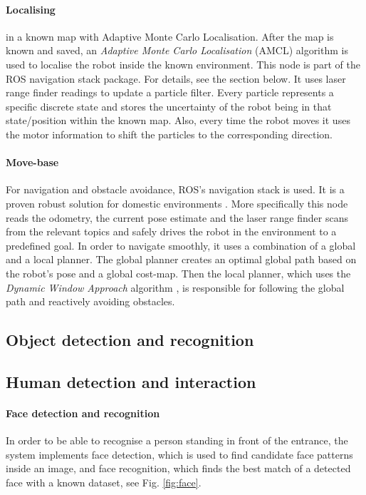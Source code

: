 \paragraph{Localising} in a known map with Adaptive Monte Carlo Localisation.
After the map is known and saved, an \textit{Adaptive Monte Carlo Localisation} (AMCL)\cite{amcl} algorithm is used to localise the robot inside the known environment. This node is part of the ROS \textsf{navigation stack} package. For details, see the section below. It uses laser range finder readings to update a particle filter. Every particle represents a specific discrete state and stores the uncertainty of the robot being in that state/position within the known map. Also, every time the robot moves it uses the motor information to shift the particles to the corresponding direction.

\paragraph{Move-base} For navigation and obstacle avoidance, ROS's \textsf{navigation stack} is used. It is a proven robust solution for domestic environments \cite{Marder-Eppstein2010}. More specifically this node reads the odometry, the current pose estimate and the laser range finder scans from the relevant topics and safely drives the robot in the environment to a predefined goal. In order to navigate smoothly, it uses a combination of a global and a local planner. The global planner creates an optimal global path based on the robot's pose and a global cost-map. Then the local planner, which uses the \textit{Dynamic Window Approach} algorithm \cite{dwa}, is responsible for following the global path and reactively avoiding obstacles.


\subsection{Object detection and recognition}

\subsection{Human detection and interaction}

\paragraph{\label{sec:vision}Face detection and recognition}
In order to be able to recognise a person standing in front of the entrance, the system implements face detection, which is used to find candidate face patterns inside an image, and face recognition, which finds the best match of a detected face with a known dataset, see Fig. \ref{fig:face}.

